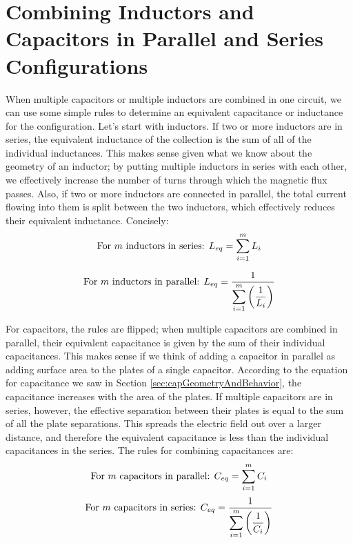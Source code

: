 \section{Combining Inductors and Capacitors in Parallel and Series Configurations}
When multiple capacitors or multiple inductors are combined in one circuit, we can use some simple rules to determine an equivalent capacitance or inductance for the configuration. Let's start with inductors. If two or more inductors are in series, the equivalent inductance of the collection is the sum of all of the individual inductances. This makes sense given what we know about the geometry of an inductor; by putting multiple inductors in series with each other, we effectively increase the number of turns through which the magnetic flux passes. Also, if two or more inductors are connected in parallel, the total current flowing into them is split between the two inductors, which effectively reduces their equivalent inductance. Concisely:
$$
\textnormal{For }m\textnormal{ inductors in series:   }L_{eq} = \displaystyle\sum_{i=1}^mL_i
$$

$$
\textnormal{For }m\textnormal{ inductors in parallel:   }L_{eq} = \frac{1}{\displaystyle\sum_{i=1}^m\left(\frac{1}{L_i}\right)}
$$
\par
For capacitors, the rules are flipped; when multiple capacitors are combined in parallel, their equivalent capacitance is given by the sum of their individual capacitances. This makes sense if we think of adding a capacitor in parallel as adding surface area to the plates of a single capacitor. According to the equation for capacitance we saw in Section \ref{sec:capGeometryAndBehavior}, the capacitance increases with the area of the plates. If multiple capacitors are in series, however, the effective separation between their plates is equal to the sum of all the plate separations. This spreads the electric field out over a larger distance, and therefore the equivalent capacitance is less than the individual capacitances in the series. The rules for combining capacitances are:
$$
\textnormal{For }m\textnormal{ capacitors in parallel:   }C_{eq} = \displaystyle\sum_{i=1}^mC_i
$$
$$
\textnormal{For }m\textnormal{ capacitors in series:   }C_{eq} = \frac{1}{\displaystyle\sum_{i=1}^m\left(\frac{1}{C_i}\right)}
$$
